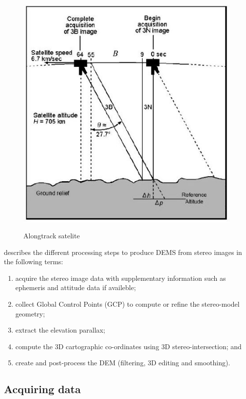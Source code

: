 \documentclass[a4paper,UKenglish]{article}
\begin{document}
\begin{figure}
	\centering
	\includegraphics[height=12.5cm]{alongtrackfigure}
	\caption{Alongtrack satelite \citep{toutin08}}
	\label{alongtrack}
\end{figure}

\cite{toutin01} describes the different processing steps to produce DEMS from stereo images in the following terms: 

\begin{enumerate}
	\item acquire the stereo image data with supplementary information such as ephemeris and attitude data if availeble;
	\item collect Global Control Points (GCP) to compute or refine the stereo-model geometry;
	\item extract the elevation parallax;
	\item compute the 3D cartographic co-ordinates using 3D stereo-intersection; and
	\item create and post-process the DEM (filtering, 3D editing and smoothing).
\end{enumerate}

\subsection{Acquiring data}
\end{document}
